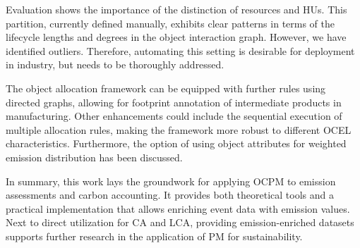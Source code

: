 Evaluation shows the importance of the distinction of resources and HUs.
This partition, currently defined manually, exhibits clear patterns in terms of the lifecycle lengths and degrees in the object interaction graph.
However, we have identified outliers.
Therefore, automating this setting is desirable for deployment in industry,
but needs to be thoroughly addressed.

The object allocation framework can be equipped with further rules using directed graphs, allowing for footprint annotation of intermediate products in manufacturing.
Other enhancements could include the sequential execution of multiple allocation rules, making the framework more robust to different OCEL characteristics.
Furthermore, the option of using object attributes for weighted emission distribution has been discussed.

In summary, this work lays the groundwork for applying OCPM to emission assessments and carbon accounting.
It provides both theoretical tools and a practical implementation that allows enriching event data with emission values.
Next to direct utilization for CA and LCA, providing emission-enriched datasets supports further research in the application of PM for sustainability.
